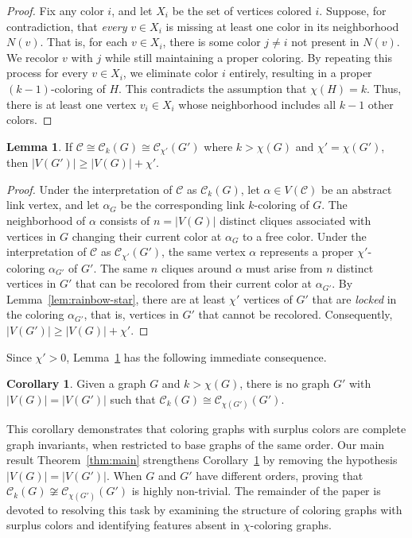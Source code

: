 \documentclass{amsart}
\theoremstyle{hypothesisstyle}
\theoremstyle{definition}
\newtheorem{lemma}[theorem]{Lemma}
\newtheorem{corollary}[theorem]{Corollary}
\theoremstyle{remark}
\numberwithin{equation}{section}
\newcommand{\C}{\mathcal C}
\begin{document}
\begin{proof}
Fix any color $i$, and let $X_i$ be the set of vertices colored $i$. Suppose, for contradiction, that \emph{every} $v \in X_i$ is missing at least one color in its neighborhood $N(v)$. That is, for each $v\in X_i$, there is some color $j\neq i$ not present in $N(v)$. We recolor $v$ with $j$ while still maintaining a proper coloring. By repeating this process for every $v \in X_i$, we eliminate color $i$ entirely, resulting in a proper $(k-1)$-coloring of $H$. This contradicts the assumption that $\chi(H)=k$. Thus, there is at least one vertex $v_i \in X_i$ whose neighborhood includes all $k-1$ other colors.
\end{proof}

\begin{lemma}\label{lem:subgraphs:order-comparison} 
If $\C\cong \C_k(G)\cong \C_{\chi'}(G')$ where $k>\chi(G)$ and $\chi'=\chi(G')$, then $|V(G')|\geq |V(G)|+\chi'$. \end{lemma}

\begin{proof}
Under the interpretation of $\mathcal{C}$ as  $\mathcal{C}_{k}(G)$, let $\alpha \in V(\mathcal{C})$ be an abstract link vertex, and let $\alpha_G$ be the corresponding link $k$-coloring of $G$. The neighborhood of $\alpha$ consists of $n=|V(G)|$ distinct cliques associated with vertices in $G$ changing their current color at $\alpha_{G}$ to a free color. Under the interpretation of $\mathcal{C}$ as $\C_{\chi'}(G')$, the same vertex $\alpha$ represents a proper $\chi'$-coloring $\alpha_{G'}$ of $G'$. The same $n$ cliques around $\alpha$ must arise from $n$ distinct vertices in $G'$ that can be recolored from their current color at $\alpha_{G'}$. By Lemma~\ref{lem:rainbow-star}, there are at least $\chi'$ vertices of $G'$ that are \emph{locked} in the coloring $\alpha_{G'}$, that is, vertices in $G'$ that cannot be recolored. Consequently, $|V(G')|\geq |V(G)|+\chi'$. 
\end{proof}

Since $\chi'>0$, Lemma~\ref{lem:subgraphs:order-comparison} has the following immediate consequence.

\begin{corollary}\label{cor:equal-number-of-vertices}
   Given a graph $G$ and $k>\chi(G)$, there is no graph $G'$ with $|V(G)|=|V(G')|$ such that $\C_k(G)\cong \C_{\chi(G')}(G')$.
\end{corollary}

This corollary demonstrates that coloring graphs with surplus colors are complete graph invariants, when restricted to base graphs of the same order. Our main result Theorem~\ref{thm:main} strengthens Corollary~\ref{cor:equal-number-of-vertices} by removing the hypothesis $|V(G)|=|V(G')|$. When $G$ and $G'$ have different orders, proving that $\C_k(G)\not\cong\C_{\chi(G')}(G')$ is highly non-trivial. The remainder of the paper is devoted to resolving this task by examining the structure of coloring graphs with surplus colors and identifying features absent in $\chi$-coloring graphs.
\end{document}

